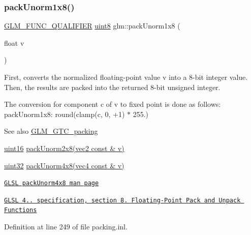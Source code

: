 \mbox{\label{group__gtc__packing_ga2f9963e5d762b10085b280d3662017ba}} 
\subsubsection{\texorpdfstring{pack\+Unorm1x8()}{packUnorm1x8()}}
{\footnotesize\ttfamily \hyperlink{setup_8hpp_a33fdea6f91c5f834105f7415e2a64407}{G\+L\+M\+\_\+\+F\+U\+N\+C\+\_\+\+Q\+U\+A\+L\+I\+F\+I\+ER} \hyperlink{group__gtc__type__precision_ga1a7dcd8aac97cc8020817c94049deff2}{uint8} glm\+::pack\+Unorm1x8 (\begin{DoxyParamCaption}\item[{float}]{v }\end{DoxyParamCaption})}

First, converts the normalized floating-\/point value v into a 8-\/bit integer value. Then, the results are packed into the returned 8-\/bit unsigned integer.

The conversion for component c of v to fixed point is done as follows\+: pack\+Unorm1x8\+: round(clamp(c, 0, +1) $\ast$ 255.)

\begin{DoxySeeAlso}{See also}
\hyperlink{group__gtc__packing}{G\+L\+M\+\_\+\+G\+T\+C\+\_\+packing} 

\hyperlink{group__gtc__type__precision_gad8c2939e1fdd8e5828b31d95c52255d5}{uint16} \hyperlink{group__gtc__packing_ga833288fc0d4a79f19d0db75a6843bfe6}{pack\+Unorm2x8(vec2 const \& v)} 

\hyperlink{group__gtc__type__precision_ga202b6a53c105fcb7e531f9b443518451}{uint32} \hyperlink{group__core__func__packing_ga834ee9a9e73dcb0a7c1fc88143f3edb8}{pack\+Unorm4x8(vec4 const \& v)} 

\href{http://www.opengl.org/sdk/docs/manglsl/xhtml/packUnorm4x8.xml}{\tt G\+L\+SL pack\+Unorm4x8 man page} 

\href{http://www.opengl.org/registry/doc/GLSLangSpec.4.20.8.pdf}{\tt G\+L\+SL 4.. specification, section 8. Floating-\/\+Point Pack and Unpack Functions} 
\end{DoxySeeAlso}


Definition at line 249 of file packing.\+inl.

\mbox{\label{group__gtc__packing_ga833288fc0d4a79f19d0db75a6843bfe6}} 
